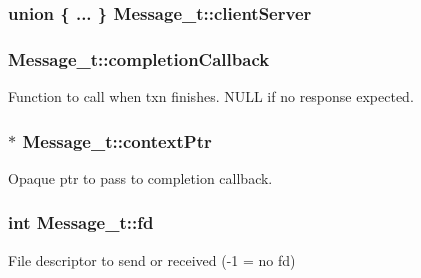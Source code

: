 \subsubsection[{\texorpdfstring{client\+Server}{clientServer}}]{\setlength{\rightskip}{0pt plus 5cm}union \{ ... \} 
     Message\+\_\+t\+::client\+Server}\hypertarget{struct_message__t_a0681daa30088f04b7844baf7bc15427c}{}\label{struct_message__t_a0681daa30088f04b7844baf7bc15427c}
\subsubsection[{\texorpdfstring{completion\+Callback}{completionCallback}}]{ Message\+\_\+t\+::completion\+Callback}\hypertarget{struct_message__t_a88bd775febafc95d43b7b6823ac7ae4e}{}\label{struct_message__t_a88bd775febafc95d43b7b6823ac7ae4e}
Function to call when txn finishes. N\+U\+LL if no response expected. 
\subsubsection[{\texorpdfstring{context\+Ptr}{contextPtr}}]{$\ast$ Message\+\_\+t\+::context\+Ptr}\hypertarget{struct_message__t_ae04c998029a8dca5a3934abe44b47594}{}\label{struct_message__t_ae04c998029a8dca5a3934abe44b47594}


Opaque ptr to pass to completion callback. 

\subsubsection[{\texorpdfstring{fd}{fd}}]{\setlength{\rightskip}{0pt plus 5cm}int Message\+\_\+t\+::fd}\hypertarget{struct_message__t_a31bc185a92a3c2d60bd891eebd8877c7}{}\label{struct_message__t_a31bc185a92a3c2d60bd891eebd8877c7}


File descriptor to send or received (-\/1 = no fd) 

